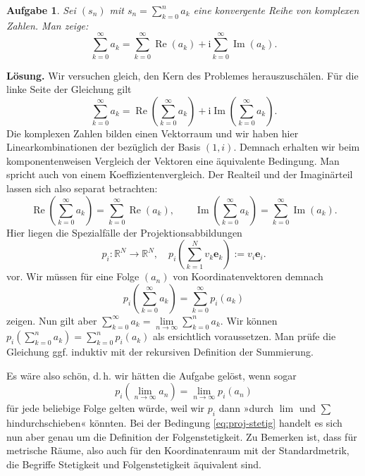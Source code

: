 \documentclass[a4paper,10pt,fleqn,twoside]{scrartcl}
\numberwithin{equation}{section}
\newcommand{\R}{\mathbb R}
\newcommand{\ui}{\mathrm i}
\newcommand{\real}{\operatorname{Re}}
\newcommand{\imag}{\operatorname{Im}}
\newcommand{\strong}[1]{{\normalfont\sffamily\bfseries #1}}
\theoremstyle{Aufgabe}
\newtheorem{Aufgabe}{\sffamily Aufgabe}[section]
\begin{document}
\begin{Aufgabe}
Sei $(s_n)$ mit $s_n=\sum_{k=0}^n a_k$ eine konvergente Reihe von
komplexen Zahlen. Man zeige:
\[\sum_{k=0}^\infty a_k
= \sum_{k=0}^\infty \real(a_k)+\ui\sum_{k=0}^\infty \imag(a_k).\]
\end{Aufgabe}
\strong{Lösung.} Wir versuchen gleich, den Kern des Problemes
herauszuschälen. Für die linke Seite der Gleichung gilt
\begin{equation}
\sum_{k=0}^\infty a_k
= \real(\sum_{k=0}^\infty a_k)+\ui\imag(\sum_{k=0}^\infty a_k).
\end{equation}
Die komplexen Zahlen bilden einen Vektorraum und wir haben hier
Linearkombinationen der bezüglich der Basis $(1,i)$. Demnach erhalten
wir beim komponentenweisen Vergleich der Vektoren eine äquivalente
Bedingung. Man spricht auch von einem Koeffizientenvergleich.
Der Realteil und der Imaginärteil lassen sich also separat betrachten:
\begin{equation}
\real(\sum_{k=0}^\infty a_k) = \sum_{k=0}^\infty \real(a_k),
\qquad \imag(\sum_{k=0}^\infty a_k) = \sum_{k=0}^\infty \imag(a_k).
\end{equation}
Hier liegen die Spezialfälle der Projektionsabbildungen
\begin{equation}
p_i\colon\R^N\to\R^N,\quad p_i(\sum_{k=1}^N v_k\mathbf e_k) := v_i\mathbf e_i.
\end{equation}
vor. Wir müssen für eine Folge $(a_n)$ von Koordinatenvektoren
demnach
\begin{equation}
p_i(\sum_{k=0}^\infty a_k) = \sum_{k=0}^\infty p_i(a_k)
\end{equation}
zeigen. Nun gilt aber
$\sum_{k=0}^\infty a_k = \lim\limits_{n\to\infty}\sum_{k=0}^n a_k$.
Wir können $p_i(\sum_{k=0}^n a_k) = \sum_{k=0}^n p_i(a_k)$ als
ersichtlich voraussetzen. Man prüfe die Gleichung ggf. induktiv mit
der rekursiven Definition der Summierung.

Es wäre also schön, d.\,h. wir hätten die Aufgabe gelöst, wenn
sogar
\begin{equation}\label{eq:proj-stetig}
p_i(\lim_{n\to\infty} a_n) = \lim_{n\to\infty} p_i(a_n)
\end{equation}
für jede beliebige Folge gelten würde, weil wir $p_i$ dann
»durch $\lim$ und $\sum$ hindurchschieben« könnten. Bei der Bedingung
\eqref{eq:proj-stetig} handelt es sich nun aber genau um die
Definition der Folgenstetigkeit. Zu Bemerken ist, dass für metrische
Räume, also auch für den Koordinatenraum mit der Standardmetrik,
die Begriffe Stetigkeit und Folgenstetigkeit äquivalent sind.
\end{document}
